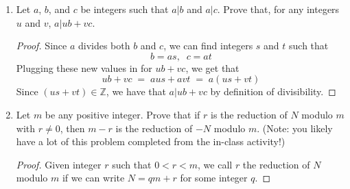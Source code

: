 \documentclass[12pt]{article}
\newcommand{\Z}{\mathbb{Z}}
\newcommand{\mmod}{\;\%\;}
\begin{document}
\begin{enumerate}
\begin{proof}
    \(k\mmod4 = 1\): So \(k = 4\ell + 1\) for some \(\ell \in \Z\), telling us...
    \begin{align*}
      N \;&=\; 5k + 2 \;=\; 5 \cdot (4\ell + 1) + 2 \;=\; 20\ell + 7 \\
          &\iff N\mmod20 = 7
    \end{align*}

    \(k\mmod4 = 2\): So \(k = 4\ell + 2\) for some \(\ell \in \Z\), telling us...
    \begin{align*}
      N \;&=\; 5k + 2 \;=\; 5 \cdot (4\ell + 2) + 2 \;=\; 20\ell + 12 \\
          &\iff N\mmod20 = 12
    \end{align*}

    \(k\mmod4 = 3\): So \(k = 4\ell + 3\) for some \(\ell \in \Z\), telling us...
    \begin{align*}
      N \;&=\; 5k + 2 \;=\; 5 \cdot (4\ell + 3) + 2 \;=\; 20\ell + 17 \\
          &\iff N\mmod20 = 17
    \end{align*}

    Since these cases cover all possible values for \(k\), we know these 4 outcomes are the only possibilities when \(N\mmod5=2\).
  \end{proof}
  
  


\item Let $a$, $b$, and $c$ be integers such that $a|b$ and $a|c$. Prove that,  for any integers $u$ and $v$, $a|ub+vc$. 
  \begin{proof}
    Since \(a\) divides both \(b\) and \(c\), we can find integers \(s\) and \(t\) such that 
    \[b = as, \;\; c = at\]
    Plugging these new values in for \(ub+vc\), we get that
    \[ub+vc \;=\; aus + avt \;=\; a (us + vt)\]
    Since \((us + vt) \in \Z\), we have that \(a|ub+vc\) by definition of divisibility.
  \end{proof}
  

\item Let $m$ be any positive integer. Prove that  if $r$ is the reduction of $N$ modulo $m$ with $r\ne 0$, then $m-r$ is the reduction of $-N$ modulo $m$.  (Note: you likely have a lot of this problem completed from the in-class activity!)

  \begin{proof}
    Given integer \(r\) such that \(0 < r < m\), we call \(r\) the reduction of \(N\) modulo \(m\) if we can write \(N = qm + r\) for some integer \(q\).
    

\end{proof}
\end{enumerate}
\end{document}
